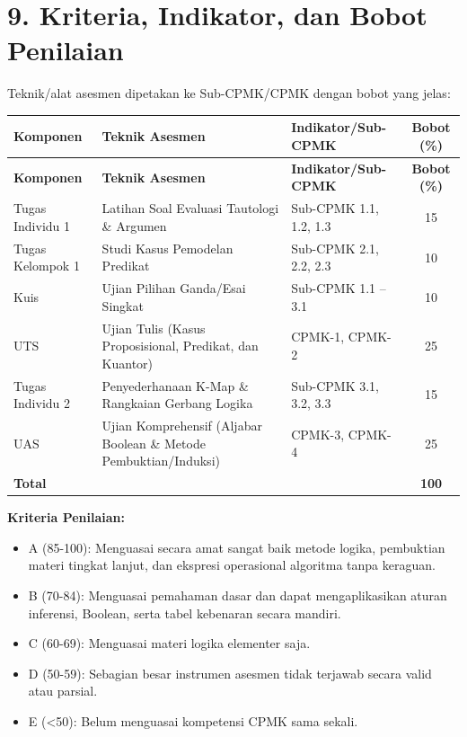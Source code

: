 \documentclass[12pt,a4paper]{article}
\begin{document}
\vspace{0.5cm}

\section*{9. Kriteria, Indikator, dan Bobot Penilaian}

Teknik/alat asesmen dipetakan ke Sub-CPMK/CPMK dengan bobot yang jelas:

\begin{longtable}{|>{\raggedright\arraybackslash}p{2.5cm}|>{\raggedright\arraybackslash}p{4cm}|>{\raggedright\arraybackslash}p{5.5cm}|c|}
\hline
\textbf{Komponen} & \textbf{Teknik Asesmen} & \textbf{Indikator/Sub-CPMK} & \textbf{Bobot (\%)} \\
\hline
\endfirsthead
\hline
\textbf{Komponen} & \textbf{Teknik Asesmen} & \textbf{Indikator/Sub-CPMK} & \textbf{Bobot (\%)} \\
\hline
\endhead
\hline
\endfoot

Tugas Individu 1 & Latihan Soal Evaluasi Tautologi \& Argumen & Sub-CPMK 1.1, 1.2, 1.3 & 15 \\
\hline
Tugas Kelompok 1 & Studi Kasus Pemodelan Predikat & Sub-CPMK 2.1, 2.2, 2.3 & 10 \\
\hline
Kuis & Ujian Pilihan Ganda/Esai Singkat & Sub-CPMK 1.1 -- 3.1 & 10 \\
\hline
UTS & Ujian Tulis (Kasus Proposisional, Predikat, dan Kuantor) & CPMK-1, CPMK-2 & 25 \\
\hline
Tugas Individu 2 & Penyederhanaan K-Map \& Rangkaian Gerbang Logika & Sub-CPMK 3.1, 3.2, 3.3 & 15 \\
\hline
UAS & Ujian Komprehensif (Aljabar Boolean \& Metode Pembuktian/Induksi) & CPMK-3, CPMK-4 & 25 \\
\hline
\textbf{Total} & & & \textbf{100} \\
\hline
\end{longtable}

\textbf{Kriteria Penilaian:}
\begin{itemize}[leftmargin=*]
  \item A (85-100): Menguasai secara amat sangat baik metode logika, pembuktian materi tingkat lanjut, dan ekspresi operasional algoritma tanpa keraguan.
  \item B (70-84): Menguasai pemahaman dasar dan dapat mengaplikasikan aturan inferensi, Boolean, serta tabel kebenaran secara mandiri.
  \item C (60-69): Menguasai materi logika elementer saja.
  \item D (50-59): Sebagian besar instrumen asesmen tidak terjawab secara valid atau parsial.
  \item E (<50): Belum menguasai kompetensi CPMK sama sekali.
\end{itemize}
\end{document}
